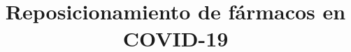 \documentclass{bmcart}
\begin{document}
	\begin{frontmatter}
	
		\begin{fmbox}
			
			
			\title{Reposicionamiento de fármacos en COVID-19}
			
			
			\author[
			  addressref={aff1},                   %
			  corref={aff1},                       %
			  email={lauranunezj99@uma.es}   %
			]{ } %
			\author[
			  addressref={aff1},
			  email={john.RS.Smith@cambridge.co.uk}
			]{ }
			\author[
			  addressref={aff1},
			  email={talal.awija@gmail.com}
			]{ }
			
			
			\address[id=aff1]{%
			  ,             %
			  ,          %
			  ,                              %
			}
		
		\end{fmbox}%
		
		\begin{abstractbox}
		
			\begin{abstract} %
			

\end{abstract}
\end{abstractbox}
\end{frontmatter}
\end{document}

